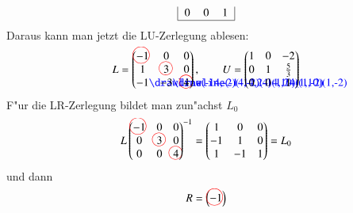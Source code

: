 \begin{beispiel}
\begin{align*}
\begin{tabular}{|>{$}c<{$}>{$}c<{$}>{$}c<{$}|}
0&0&1\\
\hline
\end{tabular}
\end{align*}
Daraus kann man jetzt die LU-Zerlegung ablesen:
\[
L=\begin{pmatrix}
-1%
\begin{picture}(0,0)
\color{red}\put(-7,4){\circle{15}}
\end{picture}%
& 0& 0\\
 1& 3%
\begin{picture}(0,0)
\color{red}\put(-3,4){\circle{12}}
\end{picture}%
& 0\\
-1%
\begin{picture}(0,0)
\color{blue}\drawline(-14,-2)(-14,24)(1,24)(1,-2)
\end{picture}%
&-3%
\begin{picture}(0,0)
\color{blue}\drawline(-14,-2)(-14,10)(1,10)(1,-2)
\end{picture}%
& 4%
\begin{picture}(0,0)
\color{red}\put(-3,4){\circle{12}}
\end{picture}%
\end{pmatrix}
,\qquad
U=\begin{pmatrix}
1& 0&-2\\
0& 1&\frac53\\
0& 0&1
\end{pmatrix}
\]
F"ur die LR-Zerlegung bildet man zun"achst $L_0$
\[
L
\begin{pmatrix}
-1%
\begin{picture}(0,0)
\color{red}\put(-7,4){\circle{15}}
\end{picture}%
& 0& 0\\
 0& 3%
\begin{picture}(0,0)
\color{red}\put(-3,4){\circle{12}}
\end{picture}%
& 0\\
 0& 0& 4%
\begin{picture}(0,0)
\color{red}\put(-3,4){\circle{12}}
\end{picture}%
\end{pmatrix}^{-1}
=
\begin{pmatrix}
 1& 0&0\\
-1& 1&0\\
 1&-1&1
\end{pmatrix}
=L_0
\]
und dann
\[
R=
\begin{pmatrix}
-1%
\begin{picture}(0,0)
\color{red}\put(-7,4){\circle{15}}

\end{picture}
\end{pmatrix}\]
\end{beispiel}
